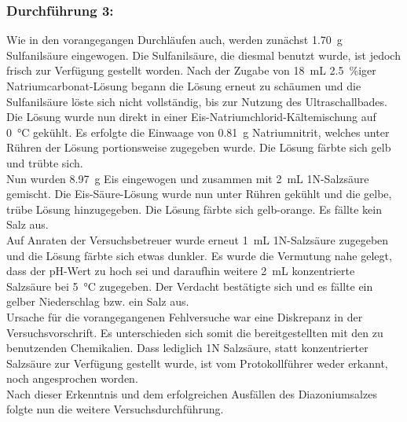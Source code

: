 \subsubsection*{Durchführung 3:}
Wie in den vorangegangen Durchläufen auch, werden zunächst \SI{1,70}{\gram} Sulfanilsäure eingewogen. Die Sulfanilsäure, die diesmal benutzt wurde, ist jedoch frisch zur Verfügung gestellt worden. Nach der Zugabe von \SI{18}{\milli \liter} \SI{2,5}{\percent}iger Natriumcarbonat-Lösung begann die Lösung erneut zu schäumen und die Sulfanilsäure löste sich nicht vollständig, bis zur Nutzung des Ultraschallbades.\\
Die Lösung wurde nun direkt in einer Eis-Natriumchlorid-Kältemischung auf \SI{0}{\celsius} gekühlt. Es erfolgte die Einwaage von \SI{0,81}{\gram} Natriumnitrit, welches unter Rühren der Lösung portionsweise zugegeben wurde. Die Lösung färbte sich gelb und trübte sich.\\
Nun wurden \SI{8,97}{\gram} Eis eingewogen und zusammen mit \SI{2}{\milli \liter} 1N-Salzsäure gemischt. Die Eis-Säure-Lösung wurde nun unter Rühren gekühlt und die gelbe, trübe Lösung hinzugegeben. Die Lösung färbte sich gelb-orange. Es fällte kein Salz aus.\\
\newpage
Auf Anraten der Versuchsbetreuer wurde erneut \SI{1}{\milli \liter} 1N-Salzsäure zugegeben und die Lösung färbte sich etwas dunkler. Es wurde die Vermutung nahe gelegt, dass der pH-Wert zu hoch sei und daraufhin weitere \SI{2}{\milli \liter} konzentrierte Salzsäure bei \SI{5}{\celsius} zugegeben. Der Verdacht bestätigte sich und es fällte ein gelber Niederschlag bzw. ein Salz aus.\\
Ursache für die vorangegangenen Fehlversuche war eine Diskrepanz in der Versuchsvorschrift. Es unterschieden sich somit die bereitgestellten mit den zu benutzenden Chemikalien. Dass lediglich 1N Salzsäure, statt konzentrierter Salzsäure zur Verfügung gestellt wurde, ist vom Protokollführer weder erkannt, noch angesprochen worden.\\
Nach dieser Erkenntnis und dem erfolgreichen Ausfällen des Diazoniumsalzes folgte nun die weitere Versuchsdurchführung.

